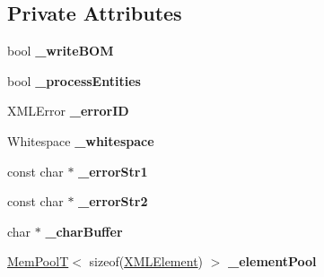 \subsection*{Private Attributes}
\begin{DoxyCompactItemize}
\item 
bool {\bfseries \+\_\+write\+B\+OM}\hypertarget{classtinyxml2_1_1_x_m_l_document_a1dbdc7feaa58007403c20243ac5abbd3}{}\label{classtinyxml2_1_1_x_m_l_document_a1dbdc7feaa58007403c20243ac5abbd3}

\item 
bool {\bfseries \+\_\+process\+Entities}\hypertarget{classtinyxml2_1_1_x_m_l_document_a9f768cb74fb5ccbadeffa436916f0194}{}\label{classtinyxml2_1_1_x_m_l_document_a9f768cb74fb5ccbadeffa436916f0194}

\item 
X\+M\+L\+Error {\bfseries \+\_\+error\+ID}\hypertarget{classtinyxml2_1_1_x_m_l_document_a61270d643f810975656da2054e1e1622}{}\label{classtinyxml2_1_1_x_m_l_document_a61270d643f810975656da2054e1e1622}

\item 
Whitespace {\bfseries \+\_\+whitespace}\hypertarget{classtinyxml2_1_1_x_m_l_document_a5342ed1e7dc1fe6afc81d4740c465320}{}\label{classtinyxml2_1_1_x_m_l_document_a5342ed1e7dc1fe6afc81d4740c465320}

\item 
const char $\ast$ {\bfseries \+\_\+error\+Str1}\hypertarget{classtinyxml2_1_1_x_m_l_document_a40948cedd3c1a0b19af0d483651e6aa8}{}\label{classtinyxml2_1_1_x_m_l_document_a40948cedd3c1a0b19af0d483651e6aa8}

\item 
const char $\ast$ {\bfseries \+\_\+error\+Str2}\hypertarget{classtinyxml2_1_1_x_m_l_document_a6627d1da446d48eefb03a86850e9bf6d}{}\label{classtinyxml2_1_1_x_m_l_document_a6627d1da446d48eefb03a86850e9bf6d}

\item 
char $\ast$ {\bfseries \+\_\+char\+Buffer}\hypertarget{classtinyxml2_1_1_x_m_l_document_a7913ff24220a40e2e2b49a5137b43d29}{}\label{classtinyxml2_1_1_x_m_l_document_a7913ff24220a40e2e2b49a5137b43d29}

\item 
\hyperlink{classtinyxml2_1_1_mem_pool_t}{Mem\+PoolT}$<$ sizeof(\hyperlink{classtinyxml2_1_1_x_m_l_element}{X\+M\+L\+Element}) $>$ {\bfseries \+\_\+element\+Pool}\hypertarget{classtinyxml2_1_1_x_m_l_document_a21574fba363a0d23bfc820d1652ab8bc}{}\label{classtinyxml2_1_1_x_m_l_document_a21574fba363a0d23bfc820d1652ab8bc}


\end{DoxyCompactItemize}
